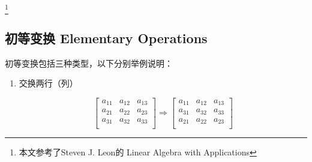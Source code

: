 \footnote{本文参考了Steven J. Leon的 Linear Algebra with Applications}

\subsection{初等变换 Elementary Operations}
初等变换包括三种类型，以下分别举例说明：

\begin{enumerate}
\item 交换两行（列）

\begin{equation}
\left[
    \begin{array}{ccc}
        a_{11} & a_{12} & a_{13}\\
        a_{21} & a_{22} & a_{23}\\
        a_{31} & a_{32} & a_{33}\\
    \end{array}
\right]
\Rightarrow
\left[
    \begin{array}{ccc}
        a_{11} & a_{12} & a_{13}\\
        a_{31} & a_{32} & a_{33}\\
        a_{21} & a_{22} & a_{23}\\
    \end{array}
\right]
\end{equation}


\end{enumerate}
